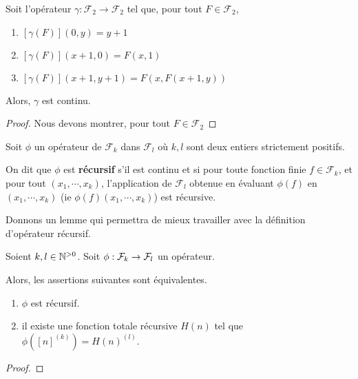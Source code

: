 \begin{proposition}
	Soit l'opérateur $\gamma : \mathcal{F}_{2} \rightarrow \mathcal{F}_{2}$
	tel que, pour tout $F \in \mathcal{F}_{2}$,
	\begin{enumerate}
		\item $[\gamma(F)] (0, y) = y + 1$
		\item $[\gamma(F)] (x + 1, 0) = F(x, 1)$
		\item $[\gamma(F)] (x + 1, y + 1) = F(x, F(x + 1, y))$
	\end{enumerate}

	Alors, $\gamma$ est continu.
\end{proposition}

\ifdefined\outputproof
\begin{proof}
	Nous devons montrer, pour tout $F \in \mathcal{F}_{2}$

\end{proof}
\fi

\begin{definition}
	Soit $\phi$ un opérateur de $\mathcal{F}_{k}$ dans $\mathcal{F}_{l}$ où $k,
	l$ sont deux entiers strictement positifs.

	On dit que $\phi$ est \textbf{récursif} s'il est continu et si pour toute fonction finie $f \in
	\mathcal{F}_{k}$, et pour tout $(x_{1}, \cdots, x_{k})$, l'application de
	$\mathcal{F}_{l}$ obtenue en évaluant $\phi(f)$ en $(x_{1}, \cdots, x_{k})$ (ie
	$\phi(f)(x_{1}, \cdots, x_{k})$) est récursive.
\end{definition}

Donnons un lemme qui permettra de mieux travailler avec la définition
d'opérateur récursif.

\begin{lemma}
	Soient $k, l \in \mathbb{N}^{> 0}$.
	Soit $\phi : \mathcal{F}_{k} \rightarrow \mathcal{F}_{l}$ un opérateur.

	Alors, les assertions suivantes sont équivalentes.
	\begin{enumerate}
		\item $\phi$ est récursif.
		\item il existe une fonction totale récursive $H(n)$
	tel que $\phi([n]^{(k)}) = H(n)^{(l)}$.
	\end{enumerate}
\end{lemma}

\ifdefined\outputproof
\begin{proof}

\end{proof}
\fi

